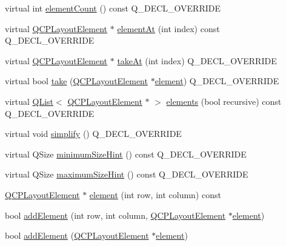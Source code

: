 \begin{DoxyCompactItemize}
\item 
virtual int \hyperlink{class_q_c_p_layout_grid_a9a8942aface780a02445ebcf14c48513}{element\+Count} () const Q\+\_\+\+D\+E\+C\+L\+\_\+\+O\+V\+E\+R\+R\+I\+DE
\item 
virtual \hyperlink{class_q_c_p_layout_element}{Q\+C\+P\+Layout\+Element} $\ast$ \hyperlink{class_q_c_p_layout_grid_a4288f174082555f6bd92021bdedb75dc}{element\+At} (int index) const Q\+\_\+\+D\+E\+C\+L\+\_\+\+O\+V\+E\+R\+R\+I\+DE
\item 
virtual \hyperlink{class_q_c_p_layout_element}{Q\+C\+P\+Layout\+Element} $\ast$ \hyperlink{class_q_c_p_layout_grid_a17dd220234d1bbf8835abcc666384d45}{take\+At} (int index) Q\+\_\+\+D\+E\+C\+L\+\_\+\+O\+V\+E\+R\+R\+I\+DE
\item 
virtual bool \hyperlink{class_q_c_p_layout_grid_aee961c2eb6cf8a85dcbc5a7d7b6c1a00}{take} (\hyperlink{class_q_c_p_layout_element}{Q\+C\+P\+Layout\+Element} $\ast$\hyperlink{class_q_c_p_layout_grid_a525f25e6ba43ee228151d074251b4e6a}{element}) Q\+\_\+\+D\+E\+C\+L\+\_\+\+O\+V\+E\+R\+R\+I\+DE
\item 
virtual \hyperlink{class_q_list}{Q\+List}$<$ \hyperlink{class_q_c_p_layout_element}{Q\+C\+P\+Layout\+Element} $\ast$ $>$ \hyperlink{class_q_c_p_layout_grid_a7d5b968b4cf57393e9e387976d91f8f7}{elements} (bool recursive) const Q\+\_\+\+D\+E\+C\+L\+\_\+\+O\+V\+E\+R\+R\+I\+DE
\item 
virtual void \hyperlink{class_q_c_p_layout_grid_a38621ca7aa633b6a9a88617df7f08672}{simplify} () Q\+\_\+\+D\+E\+C\+L\+\_\+\+O\+V\+E\+R\+R\+I\+DE
\item 
virtual Q\+Size \hyperlink{class_q_c_p_layout_grid_a361c3f5906c21a6709cb8daf5a9e019f}{minimum\+Size\+Hint} () const Q\+\_\+\+D\+E\+C\+L\+\_\+\+O\+V\+E\+R\+R\+I\+DE
\item 
virtual Q\+Size \hyperlink{class_q_c_p_layout_grid_acb285925df25b54b3db25c7b1804d230}{maximum\+Size\+Hint} () const Q\+\_\+\+D\+E\+C\+L\+\_\+\+O\+V\+E\+R\+R\+I\+DE
\item 
\hyperlink{class_q_c_p_layout_element}{Q\+C\+P\+Layout\+Element} $\ast$ \hyperlink{class_q_c_p_layout_grid_a525f25e6ba43ee228151d074251b4e6a}{element} (int row, int column) const 
\item 
bool \hyperlink{class_q_c_p_layout_grid_adff1a2ca691ed83d2d24a4cd1fe17012}{add\+Element} (int row, int column, \hyperlink{class_q_c_p_layout_element}{Q\+C\+P\+Layout\+Element} $\ast$\hyperlink{class_q_c_p_layout_grid_a525f25e6ba43ee228151d074251b4e6a}{element})
\item 
bool \hyperlink{class_q_c_p_layout_grid_a4c44025dd25acd27e053cadfd448ad7b}{add\+Element} (\hyperlink{class_q_c_p_layout_element}{Q\+C\+P\+Layout\+Element} $\ast$\hyperlink{class_q_c_p_layout_grid_a525f25e6ba43ee228151d074251b4e6a}{element})

\end{DoxyCompactItemize}

